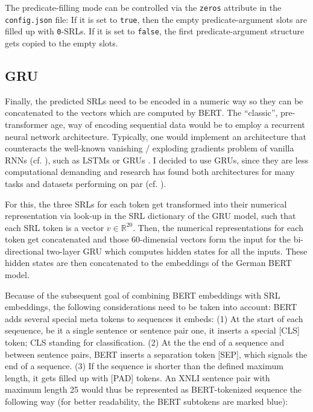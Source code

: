 \begin{tcolorbox}[
  colback=blue!5!white,
  colframe=blue!75!black,
  title={\centering Code}]

  The predicate-filling mode can be controlled via the \texttt{zeros} attribute in
  the \texttt{config.json} file: If it is set to \texttt{true}, then the empty
  predicate-argument slots are filled up with \texttt{0}-SRLs. If it is
  set to \texttt{false}, the first predicate-argument structure gets copied
  to the empty slots.

\end{tcolorbox}



\subsection{GRU}

Finally, the predicted SRLs need to be encoded in a numeric way so they can be concatenated to
the vectors which are computed by BERT. The ``classic'', pre-transformer age, way of encoding
sequential data would be to employ a recurrent neural network architecture. Typically, one would
implement an architecture that counteracts the well-known vanishing / exploding gradients problem
of vanilla RNNs (cf. \citep{bengio1994learning}), such as LSTMs \citep{hochreiter1997long} or
GRUs \citep{cho2014learning}. I decided to use GRUs, since they are less computational demanding
and research has found both architectures for many tasks and datasets performing on par (cf.
\cite{chung2014empirical}).

For this, the three SRLs for each token get transformed into their numerical representation
via look-up in the SRL dictionary of the GRU model, such that each SRL token is a vector $v
\in \mathbb{R}^{20}$. Then, the numerical representations for each token get concatenated and
those 60-dimensial vectors form the input for the bi-directional two-layer GRU which computes
hidden states for all the inputs. These hidden states are then concatenated to the embeddings
of the German BERT model.

Because of the subsequent goal of combining BERT embeddings with SRL embeddings, the following
considerations need to be taken into account:
BERT adds several special meta tokens to sequences it embeds: (1) At the start of each
seqeuence, be it a single sentence or sentence pair one, it inserts a special [CLS] token; CLS
standing for classification. (2) At the the end of a sequence and between sentence pairs, BERT
inserts a separation token [SEP], which signals the end of a sequence. (3) If the sequence
is shorter than the defined maximum length, it gets filled up with [PAD] tokens. An XNLI sentence
pair with maximum length 25 would thus be represented as BERT-tokenized sequence the following
way (for better readability, the BERT subtokens are marked blue):

